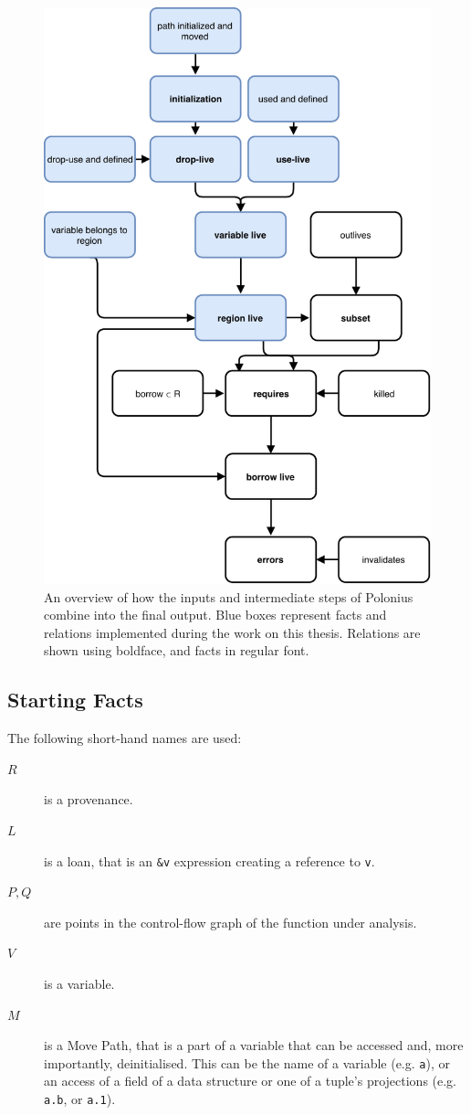 \documentclass[11pt,a4paper,twoside,openany]{report}
\newcommand{\InRust}[1]{\texttt{#1}}
\begin{document}
\begin{figure}
  \includegraphics[width=0.9\linewidth]{Graphs/polonius-overview}
  \caption{An overview of how the inputs and intermediate steps of Polonius
    combine into the final output. Blue boxes represent facts and relations
    implemented during the work on this thesis. Relations are shown using
    boldface, and facts in regular font.}
  \label{fig:polonius-overview}
\end{figure}

\subsection{Starting Facts}
\label{sec:input-facts}

The following short-hand names are used:
\begin{description}
\item[$R$] is a provenance.
\item[$L$] is a loan, that is an \InRust{&v} expression creating a reference
  to \InRust{v}.
\item[$P, Q$] are points in the control-flow graph of the function under analysis.
\item[$V$] is a variable.
\item[$M$] is a Move Path, that is a part of a variable that can be accessed
  and, more importantly, deinitialised. This can be the name of a variable (e.g.
  \InRust{a}), or an access of a field of a data structure or one of a tuple's
  projections (e.g. \InRust{a.b}, or \InRust{a.1}).
\end{description}
\end{document}
